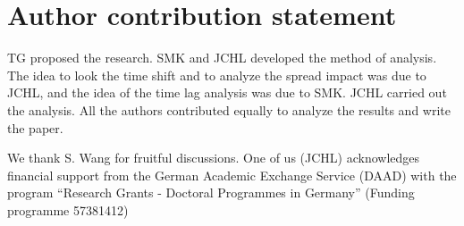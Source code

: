 \section{Author contribution statement}

TG proposed the research. SMK and JCHL developed the method of analysis.
The idea to look the time shift and to analyze the spread impact was due to
JCHL, and the idea of the time lag analysis was due to SMK. JCHL carried out
the analysis. All the authors contributed equally to analyze the results and
write the paper.

\begin{acknowledgement}
    We thank S. Wang for fruitful discussions.
    One of us (JCHL) acknowledges financial support from the German
    Academic Exchange Service (DAAD) with
    the program ``Research Grants - Doctoral Programmes in Germany''
    (Funding programme 57381412)
\end{acknowledgement}
